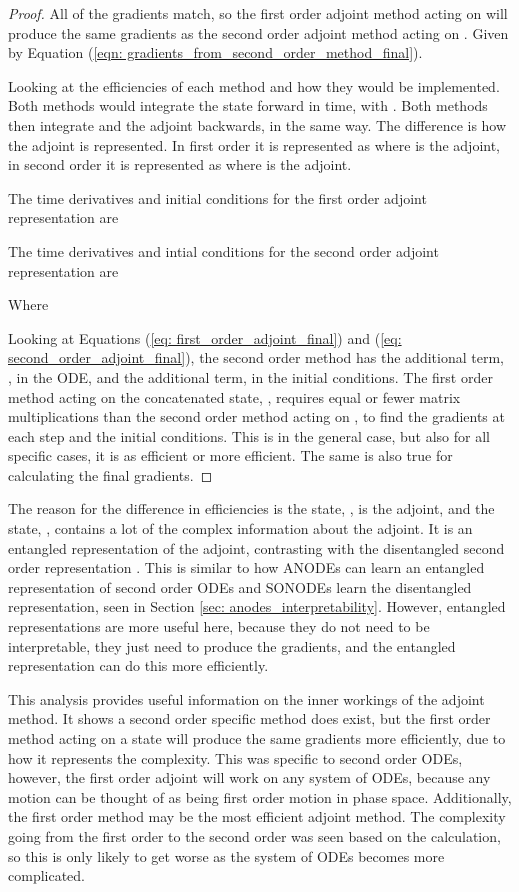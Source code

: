 \documentclass{article}
\theoremstyle{remark}
\theoremstyle{definition}
\begin{document}
\begin{proof}
All of the gradients match, so the first order adjoint method acting on  will produce the same gradients as the second order adjoint method acting on . Given by Equation (\ref{eqn: gradients_from_second_order_method_final}).

Looking at the efficiencies of each method and how they would be implemented. Both methods would integrate the state  forward in time, with . Both methods then integrate  and the adjoint backwards, in the same way. The difference is how the adjoint is represented. In first order it is represented as  where  is the adjoint, in second order it is represented as  where  is the adjoint.

The time derivatives and initial conditions for the first order adjoint representation are


The time derivatives and intial conditions for the second order adjoint representation are


Where


Looking at Equations (\ref{eq: first_order_adjoint_final}) and (\ref{eq: second_order_adjoint_final}), the second order method has the additional term, , in the ODE, and the additional term,  in the initial conditions. The first order method acting on the concatenated state, , requires equal or fewer matrix multiplications than the second order method acting on , to find the gradients at each step and the initial conditions. This is in the general case, but also for all specific cases, it is as efficient or more efficient. The same is also true for calculating the final gradients. 
\end{proof}

The reason for the difference in efficiencies is the state, , is the adjoint, and the state, , contains a lot of the complex information about the adjoint. It is an entangled representation of the adjoint, contrasting with the disentangled second order representation . This is similar to how ANODEs can learn an entangled representation of second order ODEs and SONODEs learn the disentangled representation, seen in Section \ref{sec: anodes_interpretability}. However, entangled representations are more useful here, because they do not need to be interpretable, they just need to produce the gradients, and the entangled representation can do this more efficiently.

This analysis provides useful information on the inner workings of the adjoint method. It shows a second order specific method does exist, but the first order method acting on a state  will produce the same gradients more efficiently, due to how it represents the complexity. This was specific to second order ODEs, however, the first order adjoint will work on any system of ODEs, because any motion can be thought of as being first order motion in phase space. Additionally, the first order method may be the most efficient adjoint method. The complexity going from the first order to the second order was seen based on the calculation, so this is only likely to get worse as the system of ODEs becomes more complicated.
\end{document}
